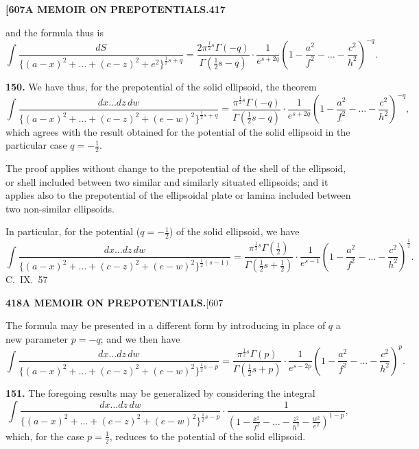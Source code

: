 \documentclass[11pt,a4paper]{article}
\begin{document}
{\newpage
\noindent\textbf{[607}\hspace{\fill}\textbf{A MEMOIR ON PREPOTENTIALS.}\hspace{\fill}\textbf{417}

and the formula thus is
\[
\int \frac{dS}{\{(a-x)^2 + \ldots + (c-z)^2 + e^2\}^{\frac{1}{2}s+q}} = \frac{2\pi^{\frac{1}{2}s}\Gamma(-q)}{\Gamma(\frac{1}{2}s-q)} \cdot \frac{1}{e^{s+2q}} \left(1 - \frac{a^2}{f^2} - \ldots - \frac{c^2}{h^2}\right)^{-q}.
\]

\medskip
\noindent\textbf{150.}
We have thus, for the prepotential of the solid ellipsoid, the theorem
\[
\int \frac{dx\ldots dz\, dw}{\{(a-x)^2 + \ldots + (c-z)^2 + (e-w)^2\}^{\frac{1}{2}s+q}} = \frac{\pi^{\frac{1}{2}s}\Gamma(-q)}{\Gamma(\frac{1}{2}s-q)} \cdot \frac{1}{e^{s+2q}} \left(1 - \frac{a^2}{f^2} - \ldots - \frac{c^2}{h^2}\right)^{-q},
\]
which agrees with the result obtained for the potential of the solid ellipsoid in the particular case $q = -\frac{1}{2}$.

The proof applies without change to the prepotential of the shell of the ellipsoid, or shell included between two similar and similarly situated ellipsoids; and it applies also to the prepotential of the ellipsoidal plate or lamina included between two non-similar ellipsoids.

In particular, for the potential ($q = -\frac{1}{2}$) of the solid ellipsoid, we have
\[
\int \frac{dx\ldots dz\, dw}{\{(a-x)^2 + \ldots + (c-z)^2 + (e-w)^2\}^{\frac{1}{2}(s-1)}} = \frac{\pi^{\frac{1}{2}s}\Gamma(\frac{1}{2})}{\Gamma(\frac{1}{2}s+\frac{1}{2})} \cdot \frac{1}{e^{s-1}} \left(1 - \frac{a^2}{f^2} - \ldots - \frac{c^2}{h^2}\right)^{\frac{1}{2}}.
\]
\hfill C.~IX.\ 57

\newpage
\noindent\textbf{418}\hspace{\fill}\textbf{A MEMOIR ON PREPOTENTIALS.}\hspace{\fill}[607

The formula may be presented in a different form by introducing in place of $q$ a new parameter $p = -q$; and we then have
\[
\int \frac{dx\ldots dz\, dw}{\{(a-x)^2 + \ldots + (c-z)^2 + (e-w)^2\}^{\frac{1}{2}s-p}} = \frac{\pi^{\frac{1}{2}s}\Gamma(p)}{\Gamma(\frac{1}{2}s+p)} \cdot \frac{1}{e^{s-2p}} \left(1 - \frac{a^2}{f^2} - \ldots - \frac{c^2}{h^2}\right)^{p}.
\]

\medskip
\noindent\textbf{151.}
The foregoing results may be generalized by considering the integral
\[
\int \frac{dx\ldots dz\, dw}{\{(a-x)^2 + \ldots + (c-z)^2 + (e-w)^2\}^{\frac{1}{2}s-p}} \cdot \frac{1}{(1 - \frac{x^2}{f^2} - \ldots - \frac{z^2}{h^2} - \frac{w^2}{e^2})^{1-p}},
\]
which, for the case $p = \frac{1}{2}$, reduces to the potential of the solid ellipsoid.

}
\end{document}
